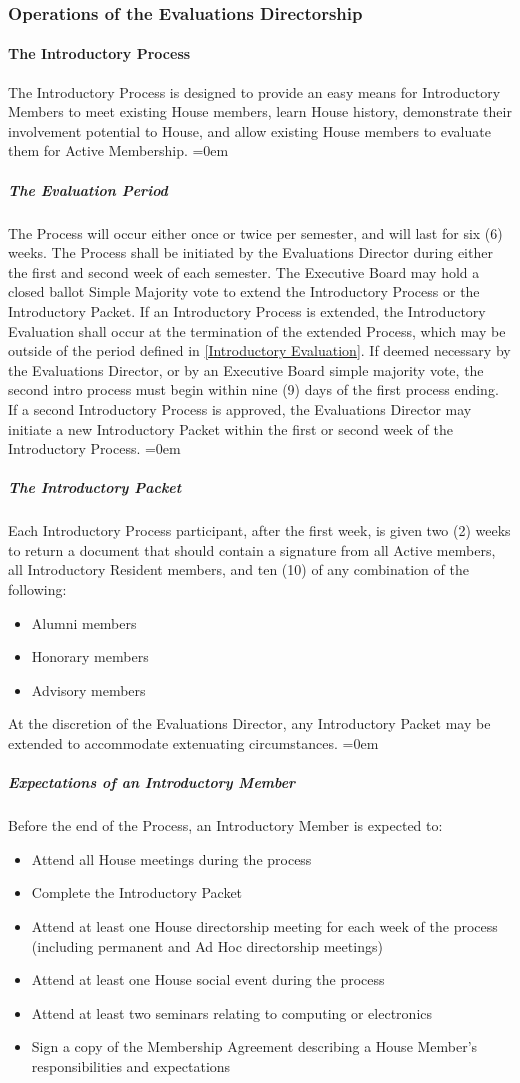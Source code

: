 \documentclass{article}
\newcommand{\asubsection}[1]{\subsubsection{#1} \label{#1}}
\newcommand{\asubsubsection}[1]{\paragraph{#1} \label{#1}}
\newcommand{\asubsubsubsection}[1]{\parindent=0em\subparagraph{#1} \label{#1}}
\begin{document}
\asubsection{Operations of the Evaluations Directorship}
\asubsubsection{The Introductory Process}
The Introductory Process is designed to provide an easy means for Introductory Members to meet existing House members, learn House history, demonstrate their involvement potential to House, and allow existing House members to evaluate them for Active Membership.
\asubsubsubsection{The Evaluation Period}
The Process will occur either once or twice per semester, and will last for six (6) weeks.
The Process shall be initiated by the Evaluations Director during either the first and second week of each semester.
The Executive Board may hold a closed ballot Simple Majority vote to extend the Introductory Process or the Introductory Packet.
If an Introductory Process is extended, the Introductory Evaluation shall occur at the termination of the extended Process, which may be outside of the period defined in \ref{Introductory Evaluation}.
If deemed necessary by the Evaluations Director, or by an Executive Board simple majority vote, the second intro process must begin within nine (9) days of the first process ending.
If a second Introductory Process is approved, the Evaluations Director may initiate a new Introductory Packet within the first or second week of the Introductory Process.
\asubsubsubsection{The Introductory Packet}
Each Introductory Process participant, after the first week, is given two (2) weeks to return a document that should contain a signature from all Active members, all Introductory Resident members, and ten (10) of any combination of the following:
\begin{itemize}
	\item Alumni members
	\item Honorary members
	\item Advisory members
\end{itemize}
At the discretion of the Evaluations Director, any Introductory Packet may be extended to accommodate extenuating circumstances.
\asubsubsubsection{Expectations of an Introductory Member}
Before the end of the Process, an Introductory Member is expected to:
\begin{itemize}
\item Attend all House meetings during the process
\item Complete the Introductory Packet
\item Attend at least one House directorship meeting for each week of the process (including permanent and Ad Hoc directorship meetings)
\item Attend at least one House social event during the process
\item Attend at least two seminars relating to computing or electronics
\item Sign a copy of the Membership Agreement describing a House Member’s responsibilities and expectations
\end{itemize}
\end{document}
